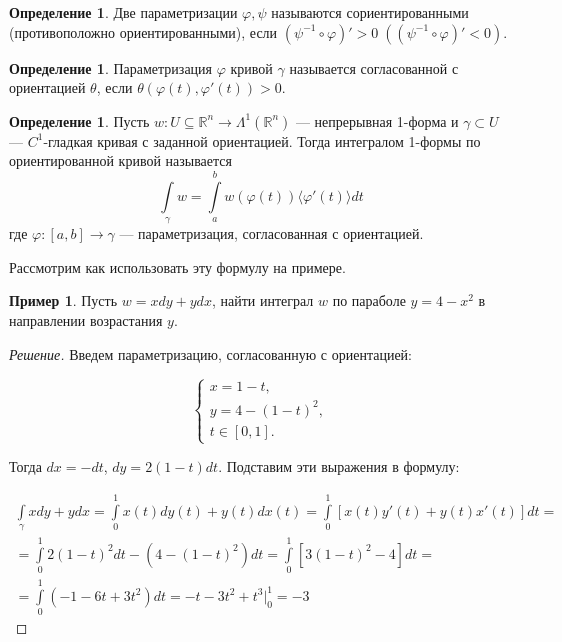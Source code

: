 \documentclass[a5paper]{article}
\newcounter{through}
\theoremstyle{plain}
\theoremstyle{definition}
\newtheorem{definition}[through]{Определение}
\newtheorem{example}[through]{Пример}
\numberwithin{through}{section}
\numberwithin{equation}{section}
\begin{document}
\begin{definition}
	Две параметризации $\varphi, \psi$ называются сориентированными (противоположно ориентированными), если $(\psi^{-1} \circ \varphi)' > 0 \; ((\psi^{-1} \circ \varphi)' < 0)$.
\end{definition}

\begin{definition}
	Параметризация $\varphi$ кривой $\gamma$ называется согласованной с ориентацией $\theta$, если $\theta(\varphi(t), \varphi'(t))>0$.
\end{definition}

\begin{definition}\label{CurveInt1fprm}
	Пусть $w : U \subseteq \mathbb{R}^n \to \Lambda^1(\mathbb{R}^n)$ --- непрерывная 1-форма и $\gamma \subset U$ --- $C^1$-гладкая кривая с заданной ориентацией. Тогда интегралом 1-формы по ориентированной кривой называется \[\int\limits_{\gamma} w = \int\limits_{a}^{b} w(\varphi(t)) \langle \varphi'(t) \rangle dt\] где $\varphi : [a, b] \to \gamma$ --- параметризация, согласованная с ориентацией.
\end{definition}

Рассмотрим как использовать эту формулу на примере.

\begin{example}
	Пусть $w = xdy + ydx$, найти интеграл $w$ по параболе $y = 4 - x^2$ в направлении возрастания $y$.
\end{example}

\begin{proof}[Решение]
	Введем параметризацию, согласованную с ориентацией:
	
	\begin{equation*}
		\begin{cases}
			x = 1 - t,\\
			y = 4 - (1 - t)^2, \\
			t \in [0, 1].
		\end{cases}
	\end{equation*}
	
	Тогда $dx=-dt$, $dy=2(1-t)dt$. Подставим эти выражения в формулу:
	
	\begin{multline*}
		\int\limits_{\gamma} xdy+ydx = \int\limits_{0}^{1}x(t)dy(t)+y(t)dx(t) = \int\limits_{0}^{1} [x(t)y'(t) + y(t)x'(t)]dt  = \\ = \int\limits_{0}^{1} 2(1-t)^2dt - (4 - (1-t)^2)dt = \int\limits_{0}^{1} [3(1-t)^2 - 4]dt = \\ =  \int\limits_{0}^{1} (-1 - 6t + 3t^2)dt = -t-3t^2+t^3 \bigg|_0^1 = -3
	\end{multline*}
\end{proof}
\end{document}

